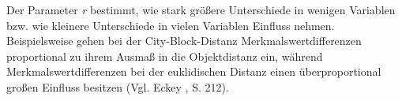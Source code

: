 Der Parameter \textit{r} bestimmt, wie stark größere Unterschiede in wenigen Variablen bzw. wie kleinere Unterschiede in vielen Variablen Einfluss nehmen. Beispielsweise gehen bei der City-Block-Distanz Merkmalswertdifferenzen proportional zu ihrem Ausmaß in die Objektdistanz ein, während Merkmalswertdifferenzen bei der euklidischen Distanz einen überproportional großen Einfluss besitzen (Vgl. Eckey \cite{Eckey.2002}, S. 212).

